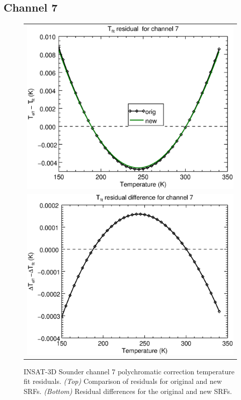 \subsection{Channel 7}
\begin{figure}[H]
  \centering
  \begin{tabular}{c}
    \includegraphics[scale=0.55]{graphics/sndr/tfit/sndr_insat3d-7.tfit.eps} \\
    \includegraphics[scale=0.55]{graphics/sndr/tfit/sndr_insat3d-7.tfit.difference.eps}
  \end{tabular}
  \caption{INSAT-3D Sounder channel 7 polychromatic correction temperature fit residuals. \emph{(Top)} Comparison of residuals for original and new SRFs. \emph{(Bottom)} Residual differences for the original and new SRFs.}
  \label{fig:sndr_ch7_tfit}
\end{figure}

